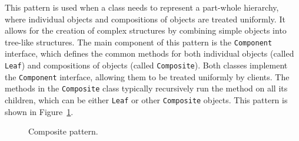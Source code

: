 This pattern is used when a class needs to represent a part-whole hierarchy, where individual objects and compositions of objects are treated uniformly. It allows for the creation of complex structures by combining simple objects into tree-like structures. The main component of this pattern is the \texttt{Component} interface, which defines the common methods for both individual objects (called \texttt{Leaf}) and compositions of objects (called \texttt{Composite}). Both classes implement the \texttt{Component} interface, allowing them to be treated uniformly by clients. The methods in the \texttt{Composite} class typically recursively run the method on all its children, which can be either \texttt{Leaf} or other \texttt{Composite} objects. This pattern is shown in Figure~\ref{fig:composite}.
\begin{figure}
    \centering
    \caption{Composite pattern.}
    \label{fig:composite}
\end{figure}

